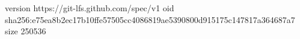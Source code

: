 version https://git-lfs.github.com/spec/v1
oid sha256:e75ea8b2ec17b10ffe57505cc4086819ae5390800d915175c147817a364687a7
size 250536
